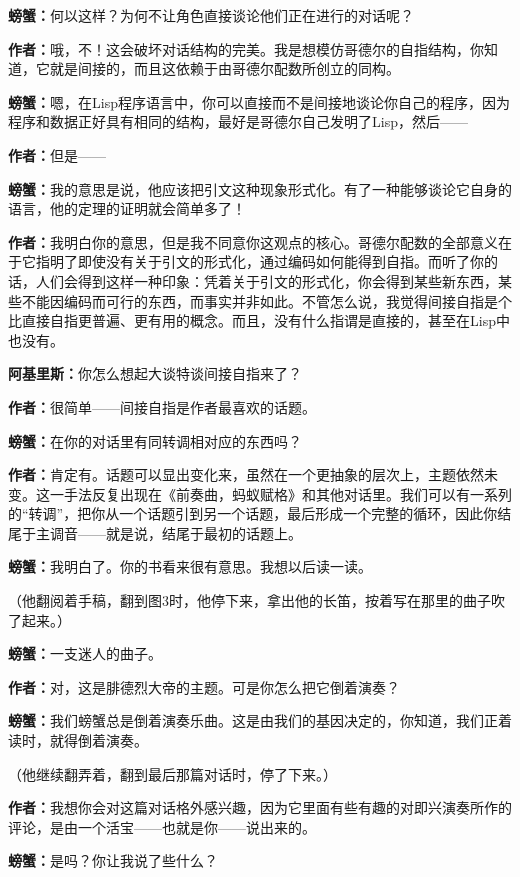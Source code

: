 \documentclass[
  12pt,
  twoside,
  openright,
  oldfontcommands,
]{memoir}
\newcommand{\dialogname}[1]{{\sffamily\bfseries #1}}
\begin{document}
\dialogname{螃蟹：}何以这样？为何不让角色直接谈论他们正在进行的对话呢？

\dialogname{作者：}哦，不！这会破坏对话结构的完美。我是想模仿哥德尔的自指结构，你知道，它就是间接的，而且这依赖于由哥德尔配数所创立的同构。

\dialogname{螃蟹：}嗯，在Lisp程序语言中，你可以直接而不是间接地谈论你自己的程序，因为程序和数据正好具有相同的结构，最好是哥德尔自己发明了Lisp，然后------

\dialogname{作者：}但是------

\dialogname{螃蟹：}我的意思是说，他应该把引文这种现象形式化。有了一种能够谈论它自身的语言，他的定理的证明就会简单多了！

\dialogname{作者：}我明白你的意思，但是我不同意你这观点的核心。哥德尔配数的全部意义在于它指明了即使没有关于引文的形式化，通过编码如何能得到自指。而听了你的话，人们会得到这样一种印象：凭着关于引文的形式化，你会得到某些新东西，某些不能因编码而可行的东西，而事实并非如此。不管怎么说，我觉得间接自指是个比直接自指更普遍、更有用的概念。而且，没有什么指谓是直接的，甚至在Lisp中也没有。

\dialogname{阿基里斯：}你怎么想起大谈特谈间接自指来了？

\dialogname{作者：}很简单------间接自指是作者最喜欢的话题。

\dialogname{螃蟹：}在你的对话里有同转调相对应的东西吗？

\dialogname{作者：}肯定有。话题可以显出变化来，虽然在一个更抽象的层次上，主题依然未变。这一手法反复出现在《前奏曲，蚂蚁赋格》和其他对话里。我们可以有一系列的``转调''，把你从一个话题引到另一个话题，最后形成一个完整的循环，因此你结尾于主调音------就是说，结尾于最初的话题上。

\dialogname{螃蟹：}我明白了。你的书看来很有意思。我想以后读一读。

（他翻阅着手稿，翻到图3时，他停下来，拿出他的长笛，按着写在那里的曲子吹了起来。）

\dialogname{螃蟹：}一支迷人的曲子。

\dialogname{作者：}对，这是腓德烈大帝的主题。可是你怎么把它倒着演奏？

\dialogname{螃蟹：}我们螃蟹总是倒着演奏乐曲。这是由我们的基因决定的，你知道，我们正着读时，就得倒着演奏。

（他继续翻弄着，翻到最后那篇对话时，停了下来。）

\dialogname{作者：}我想你会对这篇对话格外感兴趣，因为它里面有些有趣的对即兴演奏所作的评论，是由一个活宝------也就是你------说出来的。

\dialogname{螃蟹：}是吗？你让我说了些什么？
\end{document}

